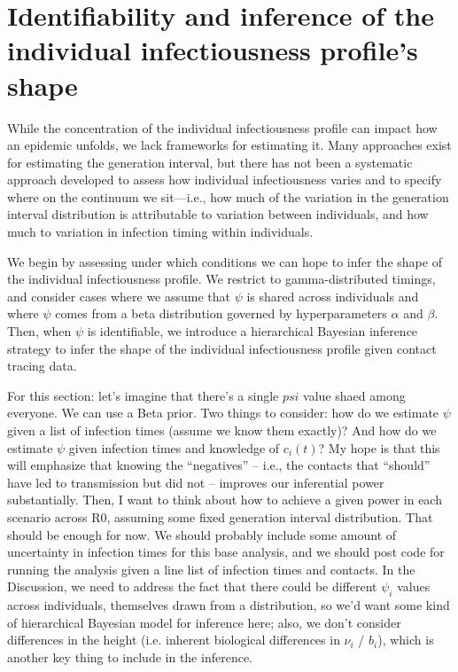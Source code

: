 \clearpage

\section{Identifiability and inference of the individual infectiousness profile's shape}

While the concentration of the individual infectiousness profile can impact how an epidemic unfolds, we lack frameworks for estimating it. Many approaches exist for estimating the generation interval, but there has not been a systematic approach developed to assess how individual infectiousness varies and to specify where on the continuum we sit---i.e., how much of the variation in the generation interval distribution is attributable to variation between individuals, and how much to variation in infection timing within individuals.

We begin by assessing under which conditions we can hope to infer the shape of the individual infectiousness profile. We restrict to gamma-distributed timings, and consider cases where we assume that $\psi$ is shared across individuals and where $\psi$ comes from a beta distribution governed by hyperparameters $\alpha$ and $\beta$. Then, when $\psi$ is identifiable, we introduce a hierarchical Bayesian inference strategy to infer the shape of the individual infectiousness profile given contact tracing data. 

For this section: let's imagine that there's a single $psi$ value shaed among everyone. We can use a Beta prior. Two things to consider: how do we estimate $\psi$ given a list of infection times (assume we know them exactly)? And how do we estimate $\psi$ given infection times and knowledge of $c_i(t)$? My hope is that this will emphasize that knowing the ``negatives'' -- i.e., the contacts that ``should'' have led to transmission but did not -- improves our inferential power substantially. Then, I want to think about how to achieve a given power in each scenario across R0, assuming some fixed generation interval distribution. That should be enough for now. We should probably include some amount of uncertainty in infection times for this base analysis, and we should post code for running the analysis given a line list of infection times and contacts. In the Discussion, we need to address the fact that there could be different $\psi_i$ values across individuals, themselves drawn from a distribution, so we'd want some kind of hierarchical Bayesian model for inference here; also, we don't consider differences in the height (i.e. inherent biological differences in $\nu_i$ / $b_i$), which is another key thing to include in the inference. 

